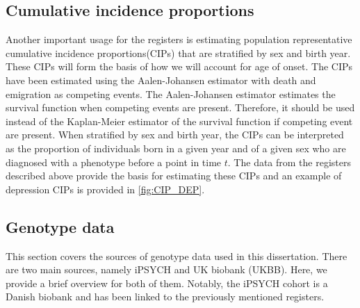 \subsection{Cumulative incidence proportions} \label{sec:CIPs}
Another important usage for the registers is estimating population representative cumulative incidence proportions(CIPs) that are stratified by sex and birth year. These CIPs will form the basis of how we will account for age of onset. The CIPs have been estimated using the Aalen-Johansen estimator\cite{hansen2017estimating} with death and emigration as competing events. The Aalen-Johansen estimator estimates the survival function when competing events are present. Therefore, it should be used instead of the Kaplan-Meier estimator of the survival function if competing event are present. When stratified by sex and birth year, the CIPs can be interpreted as the proportion of individuals born in a given year and of a given sex who are diagnosed with a phenotype before a point in time $ t $. The data from the registers described above provide the basis for estimating these CIPs and an example of depression CIPs is provided in \cref{fig:CIP_DEP}.


\subsection{Genotype data}
This section covers the sources of genotype data used in this dissertation. There are two main sources, namely iPSYCH and UK biobank (UKBB). Here, we provide a brief overview for both of them. Notably, the iPSYCH cohort is a Danish biobank and has been linked to the previously mentioned registers. 


